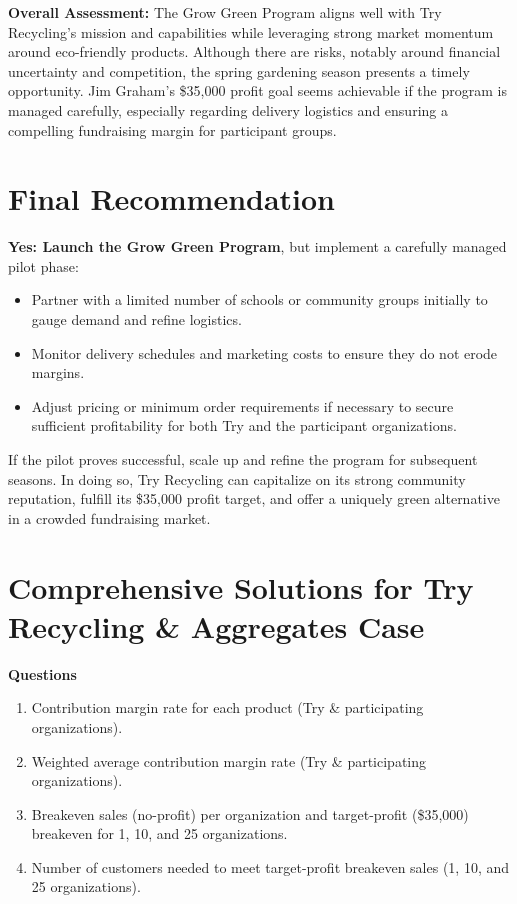 \documentclass[12pt]{article}
\begin{document}
\noindent
\textbf{Overall Assessment:} 
The Grow Green Program aligns well with Try Recycling’s mission and capabilities while leveraging strong market momentum around eco-friendly products. Although there are risks, notably around financial uncertainty and competition, the spring gardening season presents a timely opportunity. Jim Graham’s \$35,000 profit goal seems achievable if the program is managed carefully, especially regarding delivery logistics and ensuring a compelling fundraising margin for participant groups.

\section*{Final Recommendation}

\textbf{Yes: Launch the Grow Green Program}, but implement a carefully managed pilot phase:
\begin{itemize}
    \item Partner with a limited number of schools or community groups initially to gauge demand and refine logistics.
    \item Monitor delivery schedules and marketing costs to ensure they do not erode margins.
    \item Adjust pricing or minimum order requirements if necessary to secure sufficient profitability for both Try and the participant organizations.
\end{itemize}

\noindent
If the pilot proves successful, scale up and refine the program for subsequent seasons. In doing so, Try Recycling can capitalize on its strong community reputation, fulfill its \$35{,}000 profit target, and offer a uniquely green alternative in a crowded fundraising market.
\section*{Comprehensive Solutions for Try Recycling \& Aggregates Case}

\textbf{Questions}
\begin{enumerate}
    \item Contribution margin rate for each product (Try \& participating organizations).
    \item Weighted average contribution margin rate (Try \& participating organizations).
    \item Breakeven sales (no-profit) per organization and target-profit (\$35,000) breakeven for 1, 10, and 25 organizations.
    \item Number of customers needed to meet target-profit breakeven sales (1, 10, and 25 organizations).
\end{enumerate}
\end{document}
